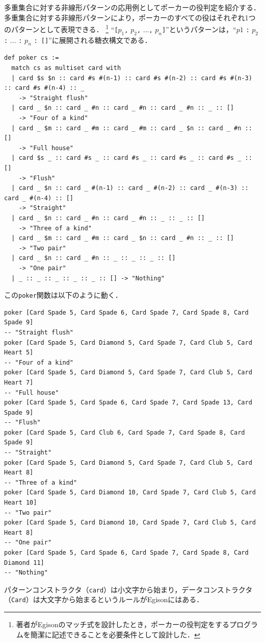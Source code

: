 多重集合に対する非線形パターンの応用例としてポーカーの役判定を紹介する．
多重集合に対する非線形パターンにより，ポーカーのすべての役はそれぞれ1つのパターンとして表現できる．
\footnote{著者がEgisonのマッチ式を設計したとき，ポーカーの役判定をするプログラムを簡潔に記述できることを必要条件として設計した．}
``\lstinline{[}$p_1$\lstinline{,} $p_2$\lstinline{,} $...$\lstinline{,} $p_n$\lstinline{]}''というパターンは，``$p1$ \lstinline{:} $p_2$ \lstinline{:} $...$ \lstinline{:} $p_n$ \lstinline{: []}''に展開される糖衣構文である．
\begin{lstlisting}[language=egison,numbers=none]
def poker cs :=
  match cs as multiset card with
  | card $s $n :: card #s #(n-1) :: card #s #(n-2) :: card #s #(n-3) :: card #s #(n-4) :: _
    -> "Straight flush"
  | card _ $n :: card _ #n :: card _ #n :: card _ #n :: _ :: []
    -> "Four of a kind"
  | card _ $m :: card _ #m :: card _ #m :: card _ $n :: card _ #n :: []
    -> "Full house"
  | card $s _ :: card #s _ :: card #s _ :: card #s _ :: card #s _ :: []
    -> "Flush"
  | card _ $n :: card _ #(n-1) :: card _ #(n-2) :: card _ #(n-3) :: card _ #(n-4) :: []
    -> "Straight"
  | card _ $n :: card _ #n :: card _ #n :: _ :: _ :: []
    -> "Three of a kind"
  | card _ $m :: card _ #m :: card _ $n :: card _ #n :: _ :: []
    -> "Two pair"
  | card _ $n :: card _ #n :: _ :: _ :: _ :: []
    -> "One pair"
  | _ :: _ :: _ :: _ :: _ :: [] -> "Nothing"
\end{lstlisting}
この\lstinline{poker}関数は以下のように動く．
\begin{lstlisting}[language=egison,numbers=none]
poker [Card Spade 5, Card Spade 6, Card Spade 7, Card Spade 8, Card Spade 9]
-- "Straight flush"
poker [Card Spade 5, Card Diamond 5, Card Spade 7, Card Club 5, Card Heart 5]
-- "Four of a kind"
poker [Card Spade 5, Card Diamond 5, Card Spade 7, Card Club 5, Card Heart 7]
-- "Full house"
poker [Card Spade 5, Card Spade 6, Card Spade 7, Card Spade 13, Card Spade 9]
-- "Flush"
poker [Card Spade 5, Card Club 6, Card Spade 7, Card Spade 8, Card Spade 9]
-- "Straight"
poker [Card Spade 5, Card Diamond 5, Card Spade 7, Card Club 5, Card Heart 8]
-- "Three of a kind"
poker [Card Spade 5, Card Diamond 10, Card Spade 7, Card Club 5, Card Heart 10]
-- "Two pair"
poker [Card Spade 5, Card Diamond 10, Card Spade 7, Card Club 5, Card Heart 8]
-- "One pair"
poker [Card Spade 5, Card Spade 6, Card Spade 7, Card Spade 8, Card Diamond 11]
-- "Nothing"
\end{lstlisting}
パターンコンストラクタ（\lstinline{card}）は小文字から始まり，データコンストラクタ（\lstinline{Card}）は大文字から始まるというルールがEgisonにはある．

